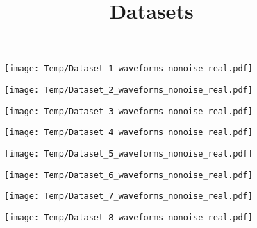 \documentclass[14pt,a4paper]{extarticle}
\title{Datasets}
\author{}
\date{}
\begin{document}
\begin{figure}
\centering
\texttt{[image: Temp/Dataset\_1\_waveforms\_nonoise\_real.pdf]}
\end{figure}

\begin{figure}
\centering
\texttt{[image: Temp/Dataset\_2\_waveforms\_nonoise\_real.pdf]}
\end{figure}

\begin{figure}
\centering
\texttt{[image: Temp/Dataset\_3\_waveforms\_nonoise\_real.pdf]}
\end{figure}

\begin{figure}
\centering
\texttt{[image: Temp/Dataset\_4\_waveforms\_nonoise\_real.pdf]}
\end{figure}

\begin{figure}
\centering
\texttt{[image: Temp/Dataset\_5\_waveforms\_nonoise\_real.pdf]}
\end{figure}

\begin{figure}
\centering
\texttt{[image: Temp/Dataset\_6\_waveforms\_nonoise\_real.pdf]}
\end{figure}

\begin{figure}
\centering
\texttt{[image: Temp/Dataset\_7\_waveforms\_nonoise\_real.pdf]}
\end{figure}

\begin{figure}
\centering
\texttt{[image: Temp/Dataset\_8\_waveforms\_nonoise\_real.pdf]}
\end{figure}
\end{document}
